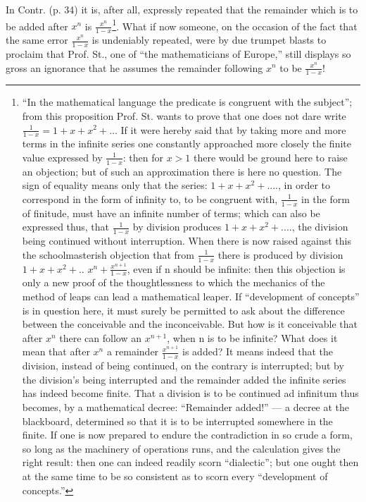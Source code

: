 \documentclass[12pt,a4paper,openany]{book}
\begin{document}
In Contr. (p. 34) it is, after all, expressly repeated that the remainder
which is to be added after $x^{n}$ is $\frac{x^{n}}{1 - x}$\footnote{``In the mathematical language the predicate is congruent with the subject''; from this proposition Prof. St. wants to prove that one does not
dare write $\frac{1}{1 - x} = 1 + x + x^{2} + \dots$ If it were hereby
said that by taking more and more terms in the infinite
series one constantly approached more closely the finite
value expressed by $\frac{1}{1 - x}$: then for $x > 1$ there would be ground here to raise an objection; but of such an approximation there is here no question. The sign of equality means only that the series: $1 + x + x^{2} + ....$, in order to correspond in the form of infinity to, to be congruent with, $\frac{1}{1 - x}$
in the form of finitude, must have an infinite number of terms; which
can also be expressed thus, that $\frac{1}{1 - x}$ by division produces
$1 + x + x^{2} + ....$, the division being continued without interruption. When there is now raised against this the schoolmasterish objection that
from $\frac{1}{1 - x}$ there is produced by division $1 + x + x^{2} + . .$
$x^{n} + \frac{x^{n+1}}{1 - x}$, even if n should be infinite: then this
objection is only a new proof of the thoughtlessness to which
the mechanics of the method of leaps can lead a mathematical leaper.
If ``development of concepts'' is in question here, it must surely
be permitted to ask about the difference between the conceivable and the inconceivable. But how is it %
conceivable that after $x^{n}$ there can follow
an $x^{n+1}$, when n is to be infinite? What does it mean that
after $x^{n}$ a remainder $\frac{x^{n+1}}{1 - x}$ is added? It means indeed that the division,
instead of being continued, on the contrary is interrupted; but by the
division's being interrupted and the remainder added the infinite series has indeed
become finite. That a division is to be continued ad infinitum
thus becomes, by a mathematical decree: ``Remainder added!'' --- a decree
at the blackboard, determined so that it is to be interrupted somewhere in the
finite. If one is now prepared to endure the contradiction in so crude a
form, so long as the machinery of operations runs, and the calculation gives
the right result: then one can indeed readily scorn
``dialectic''; but one ought then at the same time to be
so consistent as to scorn every ``development of concepts.''}. What if now
someone, on the occasion of the fact that the same error $\frac{x^{n}}{1 - x}$ is undeniably
repeated, were by due trumpet blasts to proclaim that
Prof. St., one of ``the mathematicians of Europe,'' still
displays so gross an ignorance that he assumes
the remainder following $x^{n}$ to be $\frac{x^{n}}{1 - x}$!
\end{document}
